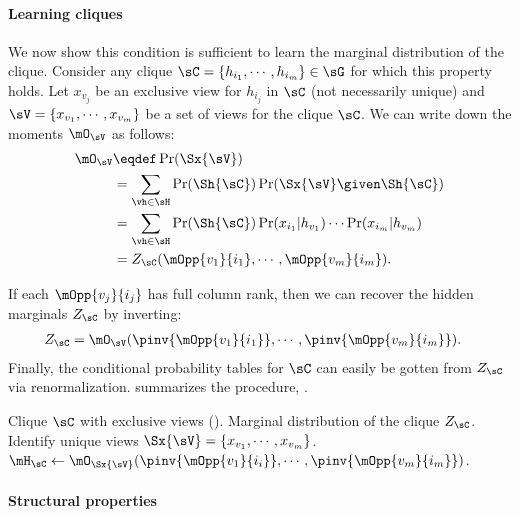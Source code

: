 \paragraph{Learning cliques}

We now show this condition is sufficient to learn the marginal
  distribution of the clique.
Consider any clique $\sC = \{h_{i_1}, \cdots, h_{i_m}\} \in \sG$ for which this property holds. Let
  $x_{v_j}$ be an exclusive view for $h_{i_j}$ in $\sC$ (not necessarily unique) and $\sV
  = \{x_{v_1}, \cdots, x_{v_m}\}$ be a set of views for the clique $\sC$.
We can write down the moments $\mO_\sV$ as follows:
\begin{align*}
  \mO_\sV 
  &\eqdef \Pr(\Sx{\sV}) \\
  &= \sum_{\vh \in \sH}
      \Pr(\Sh{\sC}) \Pr(\Sx{\sV} \given \Sh{\sC}) \\
      &= \sum_{\vh \in \sH} \Pr(\Sh{\sC}) 
          \Pr(x_{i_1} | h_{v_1}) \cdots \Pr(x_{i_m} | h_{v_m}) \\
    &= Z_{\sC}(\mOpp{v_1}{i_1},\cdots,\mOpp{v_m}{i_m}).
\end{align*}

If each $\mOpp{v_j}{i_j}$ has full column rank, then we can recover the
hidden marginals $Z_\sC$ by inverting:
\begin{align*}
  Z_{\sC} &= \mO_\sV(\pinv{\mOpp{v_1}{i_1}},\cdots,\pinv{\mOpp{v_m}{i_m}}).
\end{align*}
Finally, the conditional probability tables for $\sC$ can easily be gotten from
  $Z_\sC$ via renormalization.
 summarizes the procedure, \LearnClique.

\renewcommand{\algorithmicrequire}{\textbf{Input:}}
\renewcommand{\algorithmicensure}{\textbf{Output:}}
\begin{algorithm}
  \caption{\LearnClique}
  \label{algo:learnclique}
  \begin{algorithmic}
    \REQUIRE Clique $\sC$ with exclusive views ().
    \ENSURE Marginal distribution of the clique $Z_\sC$.
      \STATE Identify unique views $\Sx{\sV} = \{x_{v_1}, \cdots, x_{v_m}\}$.
      \STATE $\mH_\sC \gets \mO_{\Sx{\sV}}( \pinv{\mOpp{v_1}{i_i}}, \cdots, \pinv{\mOpp{v_m}{i_m}} )$.
  \end{algorithmic}
\end{algorithm}

\paragraph{Structural properties}

